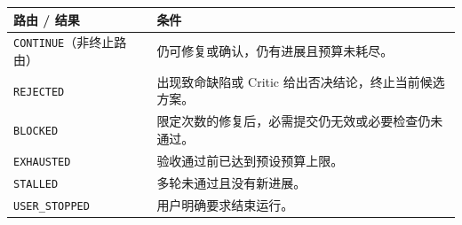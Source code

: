 \begin{tabular}{@{}P{3.5cm}P{9.0cm}@{}}
\toprule
\textbf{路由 / 结果} & \textbf{条件} \\
\midrule
\texttt{CONTINUE}\newline（非终止路由） & 仍可修复或确认，仍有进展且预算未耗尽。 \\
\texttt{REJECTED} & 出现致命缺陷或 Critic 给出否决结论，终止当前候选方案。 \\
\texttt{BLOCKED} & 限定次数的修复后，必需提交仍无效或必要检查仍未通过。 \\
\texttt{EXHAUSTED} & 验收通过前已达到预设预算上限。 \\
\texttt{STALLED} & 多轮未通过且没有新进展。 \\
\texttt{USER\_STOPPED} & 用户明确要求结束运行。 \\
\bottomrule
\end{tabular}
